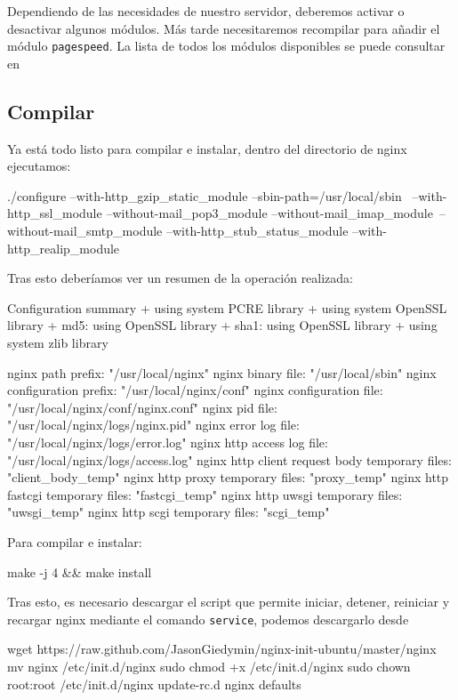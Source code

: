 Dependiendo de las necesidades de nuestro servidor, deberemos activar o
desactivar algunos módulos. Más tarde necesitaremos recompilar para añadir
el módulo \verb!pagespeed!. La lista de todos los módulos disponibles
se puede consultar en \cite{modules}

\subsection{Compilar}

Ya está todo listo para compilar e instalar, dentro del directorio de
nginx ejecutamos:
\begin{bashcode}
./configure --with-http_gzip_static_module --sbin-path=/usr/local/sbin \
--with-http_ssl_module --without-mail_pop3_module --without-mail_imap_module\
--without-mail_smtp_module --with-http_stub_status_module --with-http_realip_module
\end{bashcode}
Tras esto deberíamos ver un resumen de la operación realizada:
\begin{bashcode}
Configuration summary
  + using system PCRE library
  + using system OpenSSL library
  + md5: using OpenSSL library
  + sha1: using OpenSSL library
  + using system zlib library

  nginx path prefix: "/usr/local/nginx"
  nginx binary file: "/usr/local/sbin"
  nginx configuration prefix: "/usr/local/nginx/conf"
  nginx configuration file: "/usr/local/nginx/conf/nginx.conf"
  nginx pid file: "/usr/local/nginx/logs/nginx.pid"
  nginx error log file: "/usr/local/nginx/logs/error.log"
  nginx http access log file: "/usr/local/nginx/logs/access.log"
  nginx http client request body temporary files: "client_body_temp"
  nginx http proxy temporary files: "proxy_temp"
  nginx http fastcgi temporary files: "fastcgi_temp"
  nginx http uwsgi temporary files: "uwsgi_temp"
  nginx http scgi temporary files: "scgi_temp"
\end{bashcode}
Para compilar e instalar:
\begin{bashcode}
make -j 4 && make install
\end{bashcode}
Tras esto, es necesario descargar el script que permite iniciar, detener,
reiniciar y recargar nginx mediante el comando \verb!service!, podemos descargarlo
desde
\begin{bashcode}
wget https://raw.github.com/JasonGiedymin/nginx-init-ubuntu/master/nginx
mv nginx /etc/init.d/nginx
sudo chmod +x /etc/init.d/nginx
sudo chown root:root /etc/init.d/nginx
update-rc.d nginx defaults
\end{bashcode}
